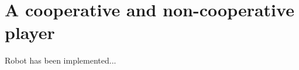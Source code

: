 \section{A cooperative and non-cooperative player}%
\label{sec:behaviour_planner}

Robot has been implemented...

